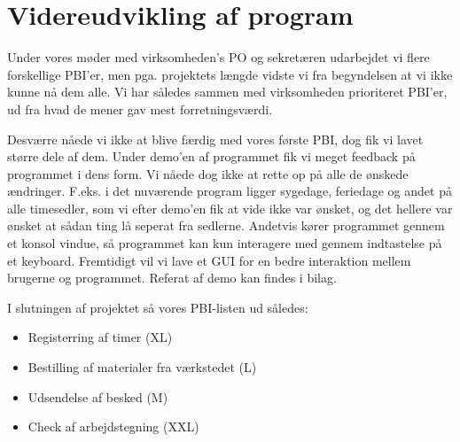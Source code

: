 \section{Videreudvikling af program}

Under vores møder med virksomheden's PO og sekretæren udarbejdet vi flere forskellige PBI'er, men pga. projektets længde vidste vi fra begyndelsen at vi ikke kunne nå dem alle. Vi har således sammen med virksomheden prioriteret PBI'er, ud fra hvad de mener gav mest forretningsværdi.

Desværre nåede vi ikke at blive færdig med vores første PBI, dog fik vi lavet større dele af dem. Under demo'en af programmet fik vi meget feedback på programmet i dens form. Vi nåede dog ikke at rette op på alle de ønskede ændringer. F.eks. i det nuværende program ligger sygedage, feriedage og andet på alle timesedler, som vi efter demo'en fik at vide ikke var ønsket, og det hellere var ønsket at sådan ting lå seperat fra sedlerne. Andetvis kører programmet gennem et konsol vindue, så programmet kan kun interagere med gennem indtastelse på et keyboard. Fremtidigt vil vi lave et GUI for en bedre interaktion mellem brugerne og programmet. Referat af demo kan findes i bilag.

I slutningen af projektet så vores PBI-listen ud således:
\begin{itemize}
\item Registerring af timer (XL)
\item Bestilling af materialer fra værkstedet (L) 
\item Udsendelse af besked (M)
\item Check af arbejdstegning (XXL)
\end{itemize}  